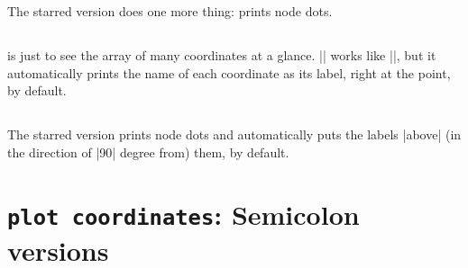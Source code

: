 The starred version \icmd{\tzcoors*} does one more thing: prints node dots.

\begin{tzcode}{.3}
\end{tzcode}



\subsection{\protect\cmd{\tzcoorsquick}}
\label{ssi:tzcoorsquick}

\icmd{\tzcoorsquick} is just to see the array of many coordinates at a glance.
|\tzcoorsquick| works like |\tzcoors|, but it automatically prints the name of each coordinate as its label, right at the point, by default.

\begin{tzcode}{.3}
\end{tzcode}

\subsection{\protect\cmd{\tzcoorsquick*}}
\label{ssi:tzcoorsquick*}

The starred version \icmd{\tzcoorsquick*} prints node dots and automatically puts the labels |above| (in the direction of |90| degree from) them, by default.

\begin{tzcode}{.3}
\end{tzcode}


\section{\texttt{plot coordinates}: Semicolon versions}
\label{si:plotcoordinates}

